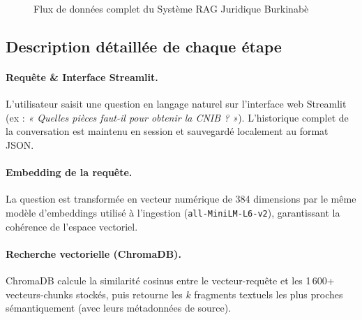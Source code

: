 \documentclass[12pt, a4paper]{article}
\begin{document}
\begin{figure}[H]
{
} %
\caption{Flux de données complet du Système RAG Juridique Burkinabè}
\end{figure}



\subsection{Description détaillée de chaque étape}

\paragraph{Requête \& Interface Streamlit.}
L'utilisateur saisit une question en langage naturel sur l'interface web Streamlit (ex : \emph{« Quelles pièces faut-il pour obtenir la CNIB ? »}). L'historique complet de la conversation est maintenu en session et sauvegardé localement au format JSON.

\paragraph{Embedding de la requête.}
La question est transformée en vecteur numérique de 384 dimensions par le même modèle d'embeddings utilisé à l'ingestion (\texttt{all-MiniLM-L6-v2}), garantissant la cohérence de l'espace vectoriel.

\paragraph{Recherche vectorielle (ChromaDB).}
ChromaDB calcule la similarité cosinus entre le vecteur-requête et les 1\,600+ vecteurs-chunks stockés, puis retourne les $k$ fragments textuels les plus proches sémantiquement (avec leurs métadonnées de source).
\end{document}
